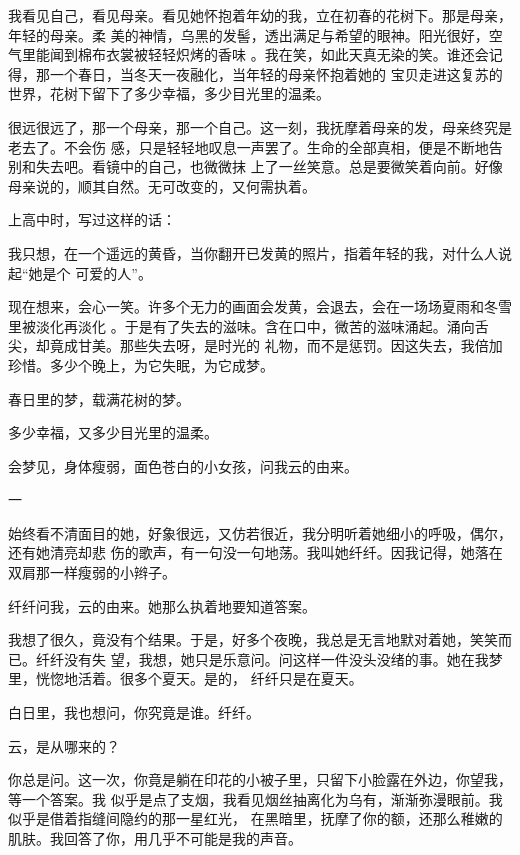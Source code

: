 \documentclass[12pt,a4paper]{article}
\newcommand{\subpart}[1]{
	\begingroup \par
	\vspace{1ex} \centering #1
	\par \endgroup \nopagebreak[4]
}
\begin{document}
		我看见自己，看见母亲。看见她怀抱着年幼的我，立在初春的花树下。那是母亲，年轻的母亲。柔
	美的神情，乌黑的发髻，透出满足与希望的眼神。阳光很好，空气里能闻到棉布衣裳被轻轻炽烤的香味
	。我在笑，如此天真无染的笑。谁还会记得，那一个春日，当冬天一夜融化，当年轻的母亲怀抱着她的
	宝贝走进这复苏的世界，花树下留下了多少幸福，多少目光里的温柔。

		很远很远了，那一个母亲，那一个自己。这一刻，我抚摩着母亲的发，母亲终究是老去了。不会伤
	感，只是轻轻地叹息一声罢了。生命的全部真相，便是不断地告别和失去吧。看镜中的自己，也微微抹
	上了一丝笑意。总是要微笑着向前。好像母亲说的，顺其自然。无可改变的，又何需执着。

		上高中时，写过这样的话：

		\longpoem{}{}{} \setlength\parindent{2\ccwd}
			我只想，在一个遥远的黄昏，当你翻开已发黄的照片，指着年轻的我，对什么人说起“她是个
		可爱的人”。
		\endlongpoem

		现在想来，会心一笑。许多个无力的画面会发黄，会退去，会在一场场夏雨和冬雪里被淡化再淡化
	。于是有了失去的滋味。含在口中，微苦的滋味涌起。涌向舌尖，却竟成甘美。那些失去呀，是时光的
	礼物，而不是惩罚。因这失去，我倍加珍惜。多少个晚上，为它失眠，为它成梦。

		春日里的梦，载满花树的梦。

		多少幸福，又多少目光里的温柔。

	\endwriting



		会梦见，身体瘦弱，面色苍白的小女孩，问我云的由来。

		\subpart{一}

		始终看不清面目的她，好象很远，又仿若很近，我分明听着她细小的呼吸，偶尔，还有她清亮却悲
	伤的歌声，有一句没一句地荡。我叫她纤纤。因我记得，她落在双肩那一样瘦弱的小辫子。

		纤纤问我，云的由来。她那么执着地要知道答案。

		我想了很久，竟没有个结果。于是，好多个夜晚，我总是无言地默对着她，笑笑而已。纤纤没有失
	望，我想，她只是乐意问。问这样一件没头没绪的事。她在我梦里，恍惚地活着。很多个夏天。是的，
	纤纤只是在夏天。

		白日里，我也想问，你究竟是谁。纤纤。

		云，是从哪来的？

		你总是问。这一次，你竟是躺在印花的小被子里，只留下小脸露在外边，你望我，等一个答案。我
	似乎是点了支烟，我看见烟丝抽离化为乌有，渐渐弥漫眼前。我似乎是借着指缝间隐约的那一星红光，
	在黑暗里，抚摩了你的额，还那么稚嫩的肌肤。我回答了你，用几乎不可能是我的声音。
\end{document}
